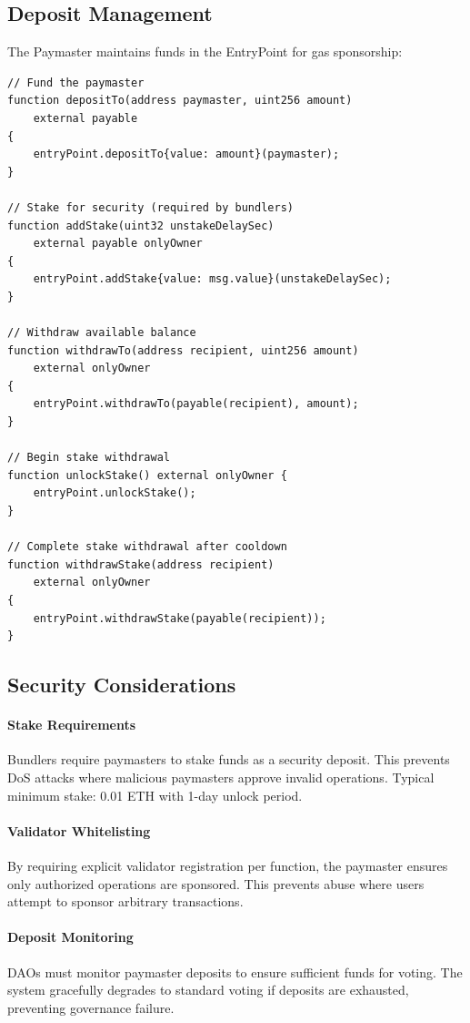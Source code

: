 \subsection{Deposit Management}

The Paymaster maintains funds in the EntryPoint for gas sponsorship:

\begin{lstlisting}[caption=Deposit Management]
// Fund the paymaster
function depositTo(address paymaster, uint256 amount)
    external payable
{
    entryPoint.depositTo{value: amount}(paymaster);
}

// Stake for security (required by bundlers)
function addStake(uint32 unstakeDelaySec)
    external payable onlyOwner
{
    entryPoint.addStake{value: msg.value}(unstakeDelaySec);
}

// Withdraw available balance
function withdrawTo(address recipient, uint256 amount)
    external onlyOwner
{
    entryPoint.withdrawTo(payable(recipient), amount);
}

// Begin stake withdrawal
function unlockStake() external onlyOwner {
    entryPoint.unlockStake();
}

// Complete stake withdrawal after cooldown
function withdrawStake(address recipient)
    external onlyOwner
{
    entryPoint.withdrawStake(payable(recipient));
}
\end{lstlisting}

\subsection{Security Considerations}

\paragraph{Stake Requirements} Bundlers require paymasters to stake funds as a security deposit. This prevents DoS attacks where malicious paymasters approve invalid operations. Typical minimum stake: 0.01 ETH with 1-day unlock period.

\paragraph{Validator Whitelisting} By requiring explicit validator registration per function, the paymaster ensures only authorized operations are sponsored. This prevents abuse where users attempt to sponsor arbitrary transactions.

\paragraph{Deposit Monitoring} DAOs must monitor paymaster deposits to ensure sufficient funds for voting. The system gracefully degrades to standard voting if deposits are exhausted, preventing governance failure.

